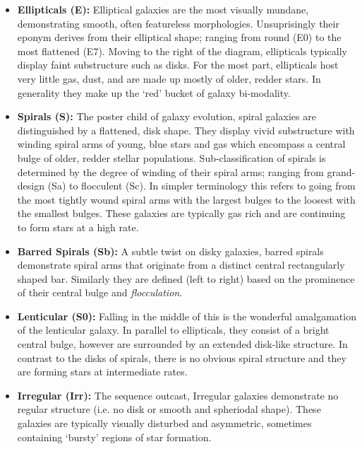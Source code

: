 \begin{itemize}
    \item \textbf{Ellipticals (E):} Elliptical galaxies are the most visually mundane, demonstrating smooth, often featureless morphologies. Unsuprisingly their eponym derives from their elliptical shape; ranging from round (E0) to the most flattened (E7). Moving to the right of the diagram, ellipticals typically display faint substructure such as disks. For the most part, ellipticals host very little gas, dust, and are made up mostly of older, redder stars. In generality they make up the `red' bucket of galaxy bi-modality.
    
    \item \textbf{Spirals (S):} The poster child of galaxy evolution, spiral galaxies are distinguished by a flattened, disk shape. They display vivid substructure with winding spiral arms of young, blue stars and gas which encompass a central bulge of older, redder stellar populations. Sub-classification of spirals is determined by the degree of winding of their spiral arms; ranging from grand-design (Sa) to flocculent (Sc). In simpler terminology this refers to going from the most tightly wound spiral arms with the largest bulges to the loosest with the smallest bulges. These galaxies are typically gas rich and are continuing to form stars at a high rate. 
    
    \item \textbf{Barred Spirals (Sb):} A subtle twist on disky galaxies, barred spirals demonstrate spiral arms that originate from a distinct central rectangularly shaped bar. Similarly they are defined (left to right) based on the prominence of their central bulge and \textit{flocculation}.
    
    \item \textbf{Lenticular (S0):} Falling in the middle of this is the wonderful amalgamation of the lenticular galaxy. In parallel to ellipticals, they consist of a bright central bulge, however are surrounded by an extended disk-like structure. In contrast to the disks of spirals, there is no obvious spiral structure and they are forming stars at intermediate rates.
    
    \item \textbf{Irregular (Irr):} The sequence outcast, Irregular galaxies demonstrate no regular structure (i.e. no disk or smooth and spheriodal shape). These galaxies are typically visually disturbed and asymmetric, sometimes containing `bursty' regions of star formation. 
\end{itemize}

